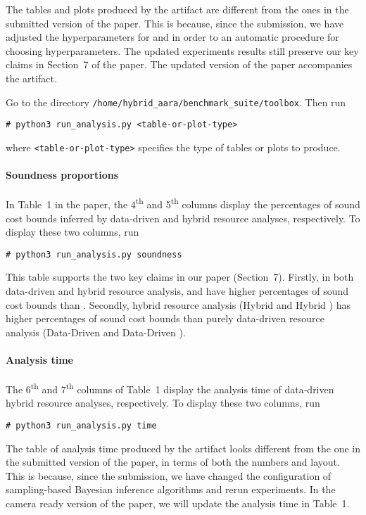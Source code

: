 The tables and plots produced by the artifact are different from the ones in the
submitted version of the paper.
%
This is because, since the submission, we have adjusted the hyperparameters for
\BayesWC{} and \BayesPC{} in order to an automatic procedure for choosing
hyperparameters.
%
The updated experiments results still preserve our key claims in Section~7 of
the paper.
%
The updated version of the paper accompanies the artifact.

Go to the directory \texttt{/home/hybrid\_aara/benchmark\_suite/toolbox}.
%
Then run
\begin{verbatim}
# python3 run_analysis.py <table-or-plot-type>
\end{verbatim}
where \texttt{<table-or-plot-type>} specifies the type of tables or plots to
produce.

\paragraph{Soundness proportions}

In Table~1 in the paper, the 4\textsuperscript{th} and 5\textsuperscript{th}
columns display the percentages of sound cost bounds inferred by data-driven and
hybrid resource analyses, respectively.
%
To display these two columns, run
\begin{verbatim}
# python3 run_analysis.py soundness
\end{verbatim}

This table supports the two key claims in our paper (Section~7).
%
Firstly, in both data-driven and hybrid resource analysis, \BayesWC{} and
\BayesPC{} have higher percentages of sound cost bounds than \Opt{}.
%
Secondly, hybrid resource analysis (Hybrid \BayesWC{} and Hybrid \BayesPC{}) has
higher percentages of sound cost bounds than purely data-driven resource
analysis (Data-Driven \BayesWC{} and Data-Driven \BayesPC{}).

\paragraph{Analysis time}

The 6\textsuperscript{th} and 7\textsuperscript{th} columns of Table~1 display
the analysis time of data-driven hybrid resource analyses, respectively.
To display these two columns, run
\begin{verbatim}
# python3 run_analysis.py time
\end{verbatim}

The table of analysis time produced by the artifact looks different from the one
in the submitted version of the paper, in terms of both the numbers and layout.
%
This is because, since the submission, we have changed the configuration of
sampling-based Bayesian inference algorithms and rerun experiments.
%
In the camera ready version of the paper, we will update the analysis time in
Table~1.

